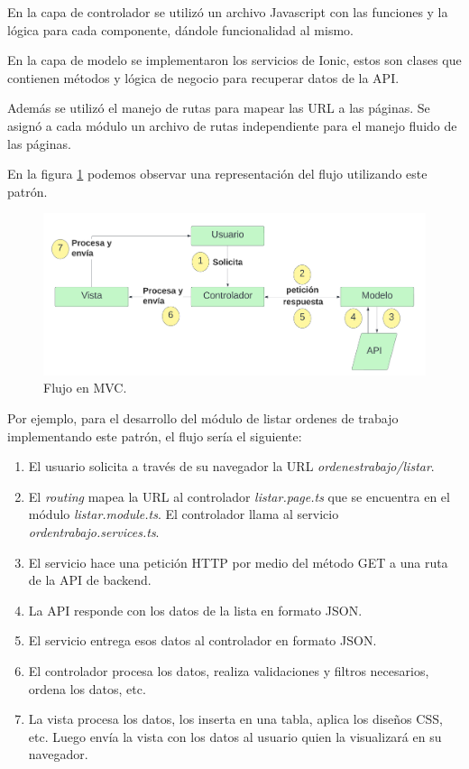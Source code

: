 En la capa de controlador se utilizó un archivo Javascript con las funciones y la lógica para cada componente, dándole funcionalidad al mismo. 

En la capa de modelo se implementaron los servicios de Ionic, estos son clases que contienen métodos y lógica de negocio para recuperar datos de la API. 

Además se utilizó el manejo de rutas para mapear las URL a las páginas. Se asignó a cada módulo un archivo de rutas independiente para el manejo fluido de las páginas.

En la figura \ref{fig:frontmvc} podemos observar una representación del flujo utilizando este patrón. 

\begin{figure}[H]
	\centering
	\includegraphics[width=\textwidth]{./Figures/front-mvc.png}
	\caption{Flujo en MVC.}
	\label{fig:frontmvc}
\end{figure}

Por ejemplo, para el desarrollo del módulo de listar ordenes de trabajo implementando este patrón, el flujo sería el siguiente:

\begin{enumerate}
\item El usuario solicita a través de su navegador la URL \textit{ordenestrabajo/listar}.
\item El \textit{routing} mapea la URL al controlador \textit{listar.page.ts} que se encuentra en el módulo \textit{listar.module.ts}. El controlador llama al servicio \textit{ordentrabajo.services.ts}.
\item El servicio hace una petición HTTP por medio del método GET a una ruta de la API de backend. 
\item La API responde con los datos de la lista en formato JSON.
\item El servicio entrega esos datos al controlador en formato JSON.
\item El controlador procesa los datos, realiza validaciones y filtros necesarios, ordena los datos, etc.
\item La vista procesa los datos, los inserta en una tabla, aplica los diseños CSS, etc. Luego envía la vista con los datos al usuario quien la visualizará en su navegador. 
\end{enumerate}

